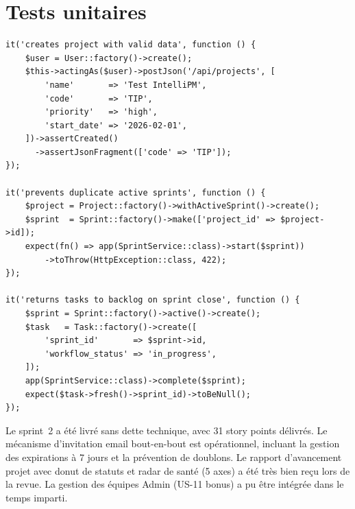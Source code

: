 \section{Tests unitaires}

\begin{lstlisting}[style=phpstyle,caption={Tests unitaires — Projets et sprints (PestPHP)},label={lst:tests_s2}]
it('creates project with valid data', function () {
    $user = User::factory()->create();
    $this->actingAs($user)->postJson('/api/projects', [
        'name'       => 'Test IntelliPM',
        'code'       => 'TIP',
        'priority'   => 'high',
        'start_date' => '2026-02-01',
    ])->assertCreated()
      ->assertJsonFragment(['code' => 'TIP']);
});

it('prevents duplicate active sprints', function () {
    $project = Project::factory()->withActiveSprint()->create();
    $sprint  = Sprint::factory()->make(['project_id' => $project->id]);
    expect(fn() => app(SprintService::class)->start($sprint))
        ->toThrow(HttpException::class, 422);
});

it('returns tasks to backlog on sprint close', function () {
    $sprint = Sprint::factory()->active()->create();
    $task   = Task::factory()->create([
        'sprint_id'       => $sprint->id,
        'workflow_status' => 'in_progress',
    ]);
    app(SprintService::class)->complete($sprint);
    expect($task->fresh()->sprint_id)->toBeNull();
});
\end{lstlisting}

\begin{chapconclusion}
Le sprint~2 a été livré sans dette technique, avec 31 story points délivrés.
Le mécanisme d'invitation email bout-en-bout est opérationnel, incluant la gestion
des expirations à 7 jours et la prévention de doublons. Le rapport d'avancement projet
avec donut de statuts et radar de santé (5 axes) a été très bien reçu lors de la revue.
La gestion des équipes Admin (US-11 bonus) a pu être intégrée dans le temps imparti.
\end{chapconclusion}
